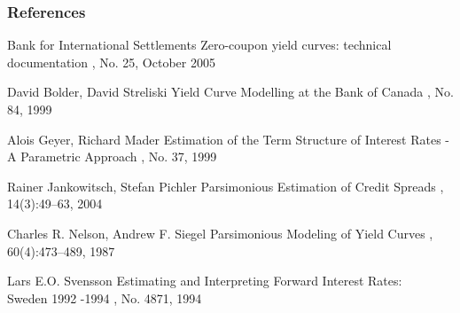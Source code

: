\documentclass[mathserif,10pt]{beamer}
\begin{document}
\begin{frame}[allowframebreaks]
 \frametitle<presentation>{References}

  \begin{thebibliography}{10}

  \scriptsize
  \beamertemplatearticlebibitems
  
   Bank for International Settlements
   \newblock Zero-coupon yield curves: technical documentation
   , No. 25, October 2005
  
   David Bolder, David Streliski
   \newblock Yield Curve Modelling at the Bank of Canada
   , No. 84, 1999
  
   Alois Geyer, Richard Mader
    \newblock Estimation of the Term Structure of Interest Rates - A Parametric Approach
    , No. 37, 1999

\framebreak
    Rainer Jankowitsch, Stefan Pichler
    \newblock Parsimonious Estimation of Credit Spreads
    , 14(3):49--63, 2004
    
    Charles R. Nelson, Andrew F. Siegel
    \newblock Parsimonious Modeling of Yield Curves
    , 60(4):473--489, 1987
    
    Lars E.O. Svensson
    \newblock Estimating and Interpreting Forward Interest Rates:\\Sweden 1992 -1994
    , No. 4871, 1994

  \end{thebibliography}
\end{frame}
\end{document}
